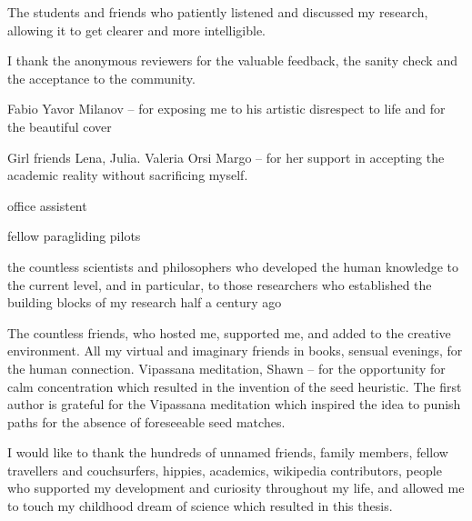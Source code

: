 The students and friends who patiently listened and discussed my research,
allowing it to get clearer and more intelligible.

I thank the anonymous reviewers for the valuable feedback, the sanity check and
the acceptance to the community. 


Fabio
Yavor Milanov -- for exposing me to his artistic disrespect to life and for the beautiful cover

Girl friends Lena, Julia.
Valeria Orsi 
Margo -- for her support in accepting the academic reality without sacrificing myself.

office assistent

fellow paragliding pilots

the countless scientists and philosophers who developed the human knowledge to
the current level, and in particular, to those researchers who established the
building blocks of my research half a century ago


The countless friends, who hosted me, supported me, and added to the creative
environment. All my virtual and imaginary friends in books, sensual evenings,
for the human connection. Vipassana meditation, Shawn -- for the opportunity for
calm concentration which resulted in the invention of the seed heuristic. The
first author is grateful for the Vipassana meditation which inspired the idea to
punish paths for the absence of foreseeable seed matches.

I would like to thank the hundreds of unnamed friends, family members, fellow
travellers and couchsurfers, hippies, academics, wikipedia contributors, people
who supported my development and curiosity throughout my life, and allowed me to
touch my childhood dream of science which resulted in this thesis.

\endgroup
